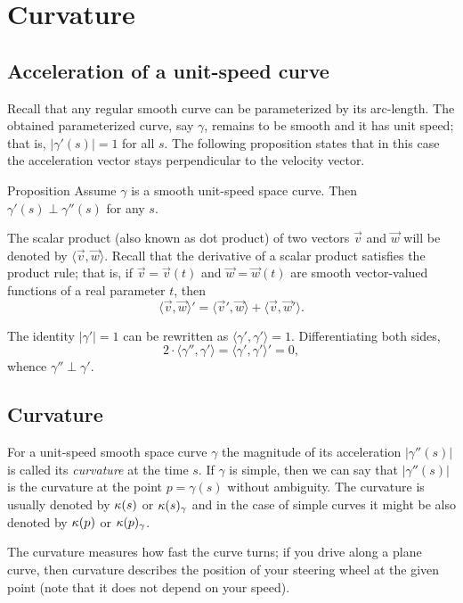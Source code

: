 \chapter{Curvature}

\section*{Acceleration of a unit-speed curve}

Recall that any regular smooth curve can be parameterized by its arc-length.
The obtained parameterized curve, say $\gamma$, remains to be smooth and it has unit speed; 
that is, $|\gamma'(s)|=1$ for all $s$.
The following proposition states that in this case
the acceleration vector stays perpendicular to the velocity vector.

\begin{thm}{Proposition}\label{prop:a'-pertp-a''}
Assume $\gamma$ is a smooth unit-speed space curve.
Then $\gamma'(s)\perp \gamma''(s)$ for any $s$.
\end{thm}

The scalar product (also known as dot product) of two vectors $\vec v$ and $\vec w$ will be denoted by $\langle \vec v,\vec w\rangle$.
Recall that the derivative of a scalar product satisfies the product rule;
that is, if $\vec v=\vec v(t)$ and $\vec w=\vec w(t)$ are smooth vector-valued functions of a real parameter $t$, then
\[\langle \vec v,\vec w\rangle'=\langle \vec v',\vec w\rangle+\langle \vec v,\vec w'\rangle.\]

The identity $|\gamma'|=1$ can be rewritten as $\langle\gamma',\gamma'\rangle=1$.
Differentiating both sides, 
\[2\cdot\langle\gamma'',\gamma'\rangle=\langle\gamma',\gamma'\rangle'=0,\]
whence $\gamma''\perp\gamma'$.
\qeds

\section*{Curvature}

For a unit-speed smooth space curve $\gamma$ the magnitude of its acceleration $|\gamma''(s)|$ is called its \emph{curvature} at the time $s$.
\label{page:curvature}
If $\gamma$ is simple, then we can say that $|\gamma''(s)|$ is the curvature at the point $p=\gamma(s)$ without ambiguity.
The curvature is usually denoted by $\kappa(s)$ or $\kappa(s)_\gamma$ and in the case of simple curves it might be also denoted by $\kappa(p)$ or $\kappa(p)_\gamma$.

The curvature measures how fast the curve turns;
if you drive along a plane curve, then curvature describes the position of your steering wheel at the given point (note that it does not depend on your speed).

